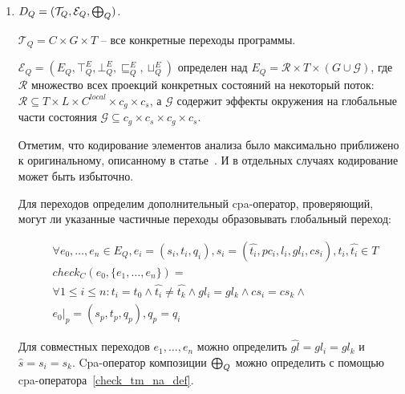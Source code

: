 
\begin{enumerate}

\item $D_Q=(\mathcal{T}_Q, \mathcal{E}_Q, \mathrel{\bigoplus}_Q)$.

$\mathcal{T}_Q=C \times G \times T$ -- все конкретные переходы программы.

$\mathcal{E}_Q=(E_Q, \top^E_Q, \bot^E_Q, \sqsubseteq^E_Q, \sqcup^E_Q)$ определен над $E_Q=\mathcal{R} \times T \times (G \cup \mathcal{G})$, где
$\mathcal{R}$ множество всех проекций конкретных состояний на некоторый поток:
$\mathcal{R} \subseteq T\times L\times C^{local} \times c_g \times c_s$, а 
$\mathcal{G}$ содержит эффекты окружения на глобальные части состояния
$\mathcal{G} \subseteq c_g \times c_s \times c_g \times c_s$.

Отметим, что кодирование элементов анализа было максимально приближено к оригинальному, описанному в статье~\cite{ThreadModular03}.
И в отдельных случаях кодирование может быть избыточно.

Для переходов определим дополнительный cpa-оператор, проверяющий, могут ли указанные частичные переходы образовывать глобальный переход:

\begin{equation}
\label{check_tm_na_def}
\begin{aligned}
& \forall e_0, \dots, e_n \in E_Q, e_i = (s_i, t_i, q_i), s_i=(\widehat{t_i},pc_i,l_i,gl_i,cs_i), t_i, \widehat{t_i} \in T\\
& check_C(e_0, \{e_1, \dots, e_n\}) = \\
& \forall 1 \le i \le n: t_i = t_0 \land \widehat{t_i} \ne \widehat{t_k} \land gl_i=gl_k \land cs_i=cs_k  \land \\
& e_0|_p = (s_p, t_p, q_p), q_p = q_i
\end{aligned}
\end{equation}

Для совместных переходов $e_1,\dots,e_n$ можно определить $\widehat{gl}=gl_i=gl_k$ и $\widehat{s}=s_i=s_k$.
Cpa-оператор композиции $\mathrel{\bigoplus}_Q$ можно определить с помощью cpa-оператора~\ref{check_tm_na_def}.


\end{enumerate}
